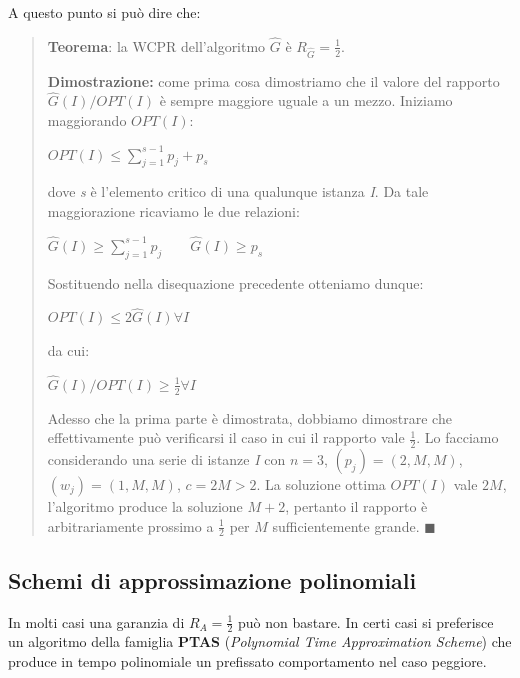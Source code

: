 \documentclass[11pt, oneside]{book}
\begin{document}
A questo punto si pu\`o dire che:

\begin{quote}
{\bf Teorema}: la WCPR dell'algoritmo $\hat{G}$ \`e $R_{\hat{G}} =
\frac{1}{2}$.

{\bf Dimostrazione:} come prima cosa dimostriamo che il valore del
rapporto $\hat{G}(I)/OPT(I)$ \`e sempre maggiore uguale a un
mezzo. Iniziamo maggiorando $OPT(I)$:

\begin{center}
$OPT(I) \leq \sum\limits_{j=1}^{s-1}p_j + p_s$  
\end{center}

dove {\em s} \`e l'elemento critico di una qualunque istanza {\em
  I}. Da tale maggiorazione ricaviamo le due relazioni:

\begin{center}
$\hat{G}(I) \geq \sum\limits_{j=1}^{s-1}p_j \qquad \hat{G}(I) \geq p_s$
\end{center}

Sostituendo nella disequazione precedente otteniamo dunque:

\begin{center}
$OPT(I) \leq 2\hat{G}(I) \forall I$  
\end{center} 

da cui:

\begin{center}
$\hat{G}(I)/OPT(I) \geq \frac{1}{2} \forall I$  
\end{center} 

Adesso che la prima parte \`e dimostrata, dobbiamo dimostrare che
effettivamente pu\`o verificarsi il caso in cui il rapporto vale
$\frac{1}{2}$. Lo facciamo considerando una serie di istanze {\em I}
con $n=3$, $(p_j) = (2,M,M)$, $(w_j) = (1,M,M)$, $c=2M>2$. La
soluzione ottima $OPT(I)$ vale $2M$, l'algoritmo produce la soluzione
$M+2$, pertanto il rapporto \`e arbitrariamente prossimo a
$\frac{1}{2}$ per $M$ sufficientemente grande. $\blacksquare$

\end{quote}

\subsection{Schemi di approssimazione polinomiali}

In molti casi una garanzia di $R_{A} = \frac{1}{2}$ pu\`o non
bastare. In certi casi si preferisce un algoritmo della famiglia {\bf
  PTAS} ({\em Polynomial Time Approximation Scheme}) che produce in
tempo polinomiale un prefissato comportamento nel caso peggiore.
\end{document}
